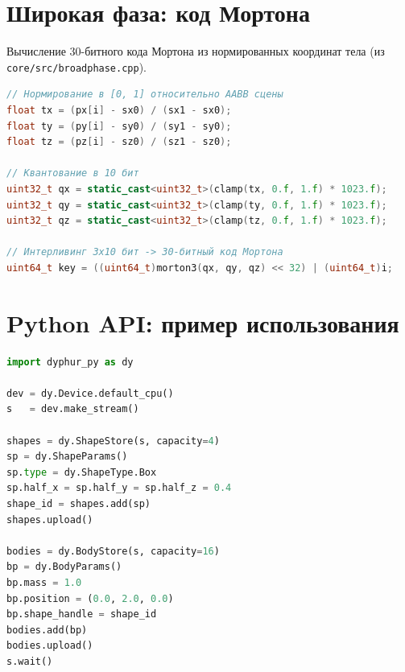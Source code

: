 \section{Широкая фаза: код Мортона}

Вычисление 30-битного кода Мортона из нормированных координат тела
(из \texttt{core/src/broadphase.cpp}).

\begin{lstlisting}[language=C++, caption={Вычисление кода Мортона (broadphase.cpp)}]
// Нормирование в [0, 1] относительно AABB сцены
float tx = (px[i] - sx0) / (sx1 - sx0);
float ty = (py[i] - sy0) / (sy1 - sy0);
float tz = (pz[i] - sz0) / (sz1 - sz0);

// Квантование в 10 бит
uint32_t qx = static_cast<uint32_t>(clamp(tx, 0.f, 1.f) * 1023.f);
uint32_t qy = static_cast<uint32_t>(clamp(ty, 0.f, 1.f) * 1023.f);
uint32_t qz = static_cast<uint32_t>(clamp(tz, 0.f, 1.f) * 1023.f);

// Интерливинг 3x10 бит -> 30-битный код Мортона
uint64_t key = ((uint64_t)morton3(qx, qy, qz) << 32) | (uint64_t)i;
\end{lstlisting}

\section{Python API: пример использования}

\begin{lstlisting}[language=Python, caption={Python API: создание тела и шаг симуляции}]
import dyphur_py as dy

dev = dy.Device.default_cpu()
s   = dev.make_stream()

shapes = dy.ShapeStore(s, capacity=4)
sp = dy.ShapeParams()
sp.type = dy.ShapeType.Box
sp.half_x = sp.half_y = sp.half_z = 0.4
shape_id = shapes.add(sp)
shapes.upload()

bodies = dy.BodyStore(s, capacity=16)
bp = dy.BodyParams()
bp.mass = 1.0
bp.position = (0.0, 2.0, 0.0)
bp.shape_handle = shape_id
bodies.add(bp)
bodies.upload()
s.wait()
\end{lstlisting}
